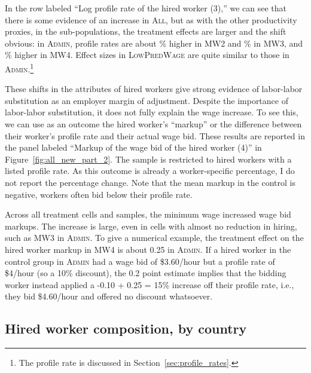 \documentclass[AER]{AEA}
\newcommand{\all}{\textsc{All}}
\newcommand{\admin}{\textsc{Admin}}
\newcommand{\lpw}{\textsc{LowPredWage}}
\begin{document}
In the row labeled ``Log profile rate of the hired worker (3),'' we can see that there is some evidence of an increase in \all{}, but as with the other productivity proxies, in the sub-populations, the treatment effects are larger and the shift obvious:
in \admin{}, profile rates are about \ADMINTwologhiredprpctchange{}\% higher in MW2 and \ADMINThreeloghiredprpctchange{}\% in MW3, and \ADMINFourloghiredprpctchange{}\% higher in MW4. 
Effect sizes in \lpw{} are quite similar to those in \admin{}.\footnote{
  The profile rate is discussed in Section~\ref{sec:profile_rates}.
}

These shifts in the attributes of hired workers give strong evidence of labor-labor substitution as an employer margin of adjustment.
Despite the importance of labor-labor substitution, it does not fully explain the wage increase.
To see this, we can use as an outcome the hired worker's ``markup'' or the difference between their worker's profile rate and their actual wage bid.
These results are reported in the panel labeled ``Markup of the wage bid of the hired worker (4)'' in Figure~\ref{fig:all_new_part_2}.
The sample is restricted to hired workers with a listed profile rate. 
As this outcome is already a worker-specific percentage, I do not report the percentage change.
Note that the mean markup in the control is negative, workers often bid below their profile rate. 


Across all treatment cells and samples, the minimum wage increased wage bid markups.
The increase is large, even in cells with almost no reduction in hiring, such as MW3 in \admin{}.   
To give a numerical example, the treatment effect on the hired worker markup in MW4 is about 0.25 in \admin{}.
If a hired worker in the control group in \admin{} had a wage bid of \$3.60/hour but a profile rate of \$4/hour (so a 10\% discount), the 0.2 point estimate implies that the bidding worker instead applied a -0.10 + 0.25 = 15\% increase off their profile rate, i.e., they bid \$4.60/hour and offered no discount whatsoever.

\subsection{Hired worker composition, by country}
\end{document}
